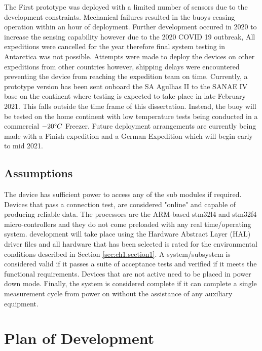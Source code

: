The First prototype was deployed with a limited number of sensors due to the development constraints. Mechanical failures resulted in the buoys ceasing operation within an hour of deployment. Further development occured in 2020 to increase the sensing capability however due to the 2020 COVID 19 outbreak, All expeditions were cancelled for the year therefore final system testing in Antarctica was not possible. Attempts were made to deploy the devices on other expeditions from other countries however, shipping delays were encountered preventing the device from reaching the expedition team on time. Currently, a prototype version has been sent onboard the SA Agulhas II to the SANAE IV base on the continent where testing is expected to take place in late February 2021. This falls outside the time frame of this dissertation. Instead, the buoy will be tested on the home  continent with low temperature tests being conducted in a commercial $-20\degree C$ Freezer. Future deployment arrangements are currently being made with a Finish expedition and a German Expedition which will begin early to mid 2021.

\subsection{Assumptions}

The device has sufficient power to access any of the sub modules if required. Devices that pass a connection test, are considered "online" and capable of producing reliable data. The processors are the ARM-based  stm32l4 and stm32f4 micro-controllers and they do not come preloaded with any real time/operating system. development will take place using the Hardware Abstract Layer (HAL) driver files and all hardware that has been selected is rated for the environmental conditions described in Section \ref{sec:ch1.section1}. A system/subsystem is considered valid if it passes a suite of acceptance tests and verified if it meets the functional requirements. Devices that are not active need to be placed in power down mode. Finally, the system is considered complete if it can complete a single measurement cycle from power on without the assistance of any auxiliary equipment.

\section{Plan of Development}
\label{sec:ch1.section3}

